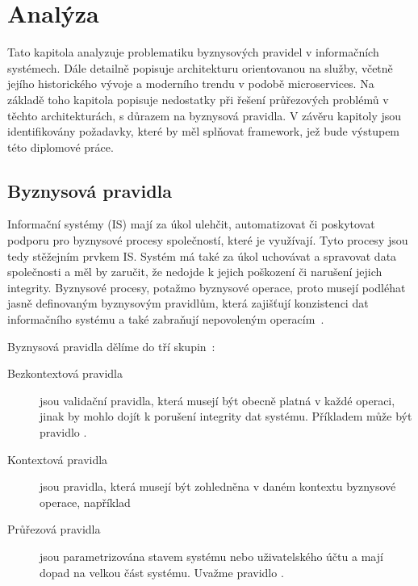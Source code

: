 
\chapter{Analýza}\label{ch:analyza}

Tato kapitola analyzuje problematiku byznysových pravidel v informačních systémech.
Dále detailně popisuje architekturu orientovanou na služby, včetně jejího historického
vývoje a moderního trendu v podobě microservices. Na základě toho kapitola popisuje nedostatky
při řešení průřezových problémů v těchto architekturách, s důrazem na byznysová pravidla.
V závěru kapitoly jsou identifikovány požadavky, které by měl splňovat framework,
jež bude výstupem této diplomové práce.

\section{Byznysová pravidla}

Informační systémy (IS) mají za úkol ulehčit, automatizovat či poskytovat podporu pro
byznysové procesy společností, které je využívají. Tyto procesy jsou tedy stěžejním
prvkem IS. Systém má také za úkol uchovávat a spravovat data společnosti
a měl by zaručit, že nedojde k jejich poškození či narušení jejich integrity.
Byznysové procesy, potažmo byznysové operace, proto musejí
podléhat jasně definovaným byznysovým pravidlům, která zajišťují konzistenci dat informačního
systému a také zabraňují nepovoleným operacím~\cite{cemus2015automated}.

Byznysová pravidla dělíme do tří skupin~\cite{cemus2014aspect}:
\begin{description}
    \item [Bezkontextová pravidla] jsou validační pravidla, která musejí být obecně platná
    v každé operaci, jinak by mohlo dojít k porušení integrity dat systému. Příkladem může
    být pravidlo .
    \item [Kontextová pravidla] jsou pravidla, která musejí být zohledněna v daném kontextu
    byznysové operace, například 
    \item [Průřezová pravidla] jsou parametrizována stavem systému nebo uživatelského účtu a mají
    dopad na velkou část systému. Uvažme pravidlo .
\end{description}

